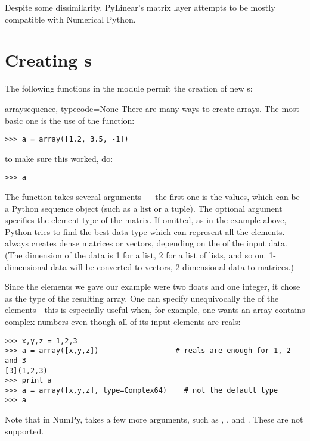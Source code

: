 Despite some dissimilarity, PyLinear's matrix layer attempts to be
mostly compatible with Numerical Python.

\section{Creating s}

The following functions in the module  permit
the creation of new s:

\begin{funcdesc}{array}{sequence, typecode=None}
   There are many ways to create arrays. The most basic one is the use of the
    function:
\begin{verbatim}
>>> a = array([1.2, 3.5, -1])
\end{verbatim}
   to make sure this worked, do:
\begin{verbatim}
>>> a
\end{verbatim}
   The  function takes several arguments --- the first
   one is the values, which can be a Python sequence object (such as a
   list or a tuple).  The optional argument  specifies the
   element type of the matrix. If omitted, as in the example above,
   Python tries to find the best data type which can represent all the
   elements.  always creates dense matrices or
   vectors, depending on the  of
   the input data.  (The dimension of the data is 1 for a list, 2 for a
   list of lists, and so on.  1-dimensional data will be converted to
   vectors, 2-dimensional data to matrices.)
   
   Since the elements we gave our example were two floats and one integer, it
   chose  as the type of the resulting array. One can specify
   unequivocally the  of the elements---this is especially 
   useful when, for example, one wants an array contains complex numbers even
   though all of its input elements are reals:
\begin{verbatim}
>>> x,y,z = 1,2,3
>>> a = array([x,y,z])                  # reals are enough for 1, 2 and 3
[3](1,2,3)
>>> print a
>>> a = array([x,y,z], type=Complex64)    # not the default type
>>> a
\end{verbatim}
    Note that in NumPy,  takes a few more arguments, such as
    , , and . These are not supported.
\end{funcdesc}

